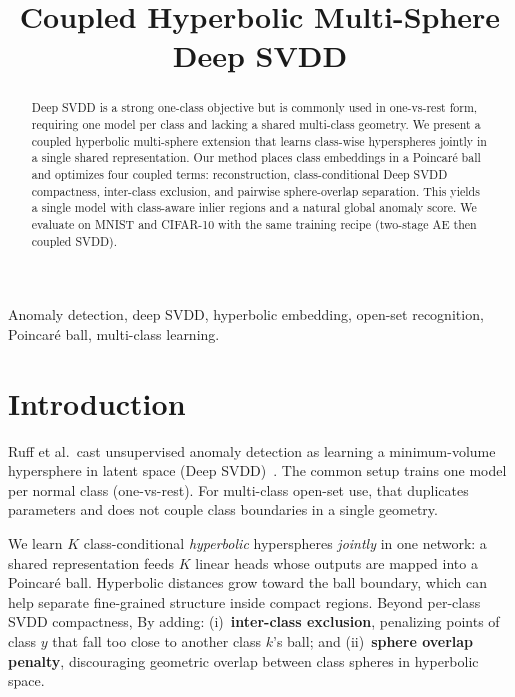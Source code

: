 \documentclass[conference]{IEEEtran}
\begin{document}
\title{Coupled Hyperbolic Multi-Sphere Deep SVDD}

\author{
}

\maketitle

\begin{abstract}

Deep SVDD is a strong one-class objective but is commonly used in one-vs-rest form, requiring one model per class and lacking a shared multi-class geometry.
We present a coupled hyperbolic multi-sphere extension that learns class-wise hyperspheres jointly in a single shared representation.
Our method places class embeddings in a Poincar\'e ball and optimizes four coupled terms: reconstruction, class-conditional Deep SVDD compactness, inter-class exclusion, and pairwise sphere-overlap separation.
This yields a single model with class-aware inlier regions and a natural global anomaly score.
We evaluate on MNIST and CIFAR-10 with the same training recipe (two-stage AE then coupled SVDD).
\end{abstract}

\begin{IEEEkeywords}

Anomaly detection, deep SVDD, hyperbolic embedding, open-set recognition, Poincar\'e ball, multi-class learning.
\end{IEEEkeywords}

\section{Introduction}

Ruff et al.\ cast unsupervised anomaly detection as learning a minimum-volume hypersphere in latent space (Deep SVDD)~\cite{ruff2018deep}.
The common setup trains one model per normal class (one-vs-rest).
For multi-class open-set use, that duplicates parameters and does not couple class boundaries in a single geometry.

We learn $K$ class-conditional \emph{hyperbolic} hyperspheres \emph{jointly} in one network: a shared representation feeds $K$ linear heads whose outputs are mapped into a Poincar\'e ball.
Hyperbolic distances grow toward the ball boundary, which can help separate fine-grained structure inside compact regions.
Beyond per-class SVDD compactness, By adding: (i)~\textbf{inter-class exclusion}, penalizing points of class $y$ that fall too close to another class $k$'s ball; and (ii)~\textbf{sphere overlap penalty}, discouraging geometric overlap between class spheres in hyperbolic space.
\end{document}
